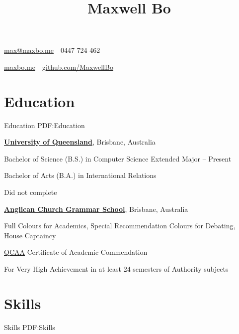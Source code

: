 \documentclass[a4paper,10pt,oneside]{article}
\begin{document}

\title{Maxwell Bo}

\begin{subtitle}
\par \href{mailto:max@maxbo.me}{max@maxbo.me} \,\BulletSymbol\, 0447 724 462

\par \href{http://maxbo.me/}{maxbo.me} \,\BulletSymbol\, \href{https://github.com/MaxwellBo}{github.com/MaxwellBo}

\end{subtitle}

\begin{body}


\section
{Education}
{Education}
{PDF:Education}

\href{https://www.uq.edu.au/}{\textbf{University of Queensland}}, Brisbane, Australia
\par Bachelor of Science (B.S.) in Computer Science Extended Major\hfill {} -- Present
\par Bachelor of Arts (B.A.) in International Relations\hfill {}
\begin{detail}
Did not complete
\end{detail}

\EntryGap

\href{https://www.churchie.com.au/}{\textbf{Anglican Church Grammar School}}, Brisbane, Australia
\par Full Colours for Academics, Special Recommendation Colours for Debating, House Captaincy \hfill {}
\par \href{https://www.qcaa.qld.edu.au/}{QCAA} Certificate of Academic Commendation \hfill {}
\begin{detail}
For Very High Achievement in at least 24 semesters of Authority subjects
\end{detail}


\section
{Skills}
{Skills}
{PDF:Skills}


\end{body}
\end{document}
